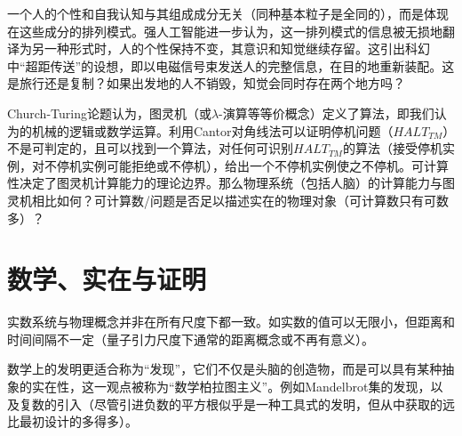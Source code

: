 \par 一个人的个性和自我认知与其组成成分无关（同种基本粒子是全同的），而是体现在这些成分的排列模式。强人工智能进一步认为，这一排列模式的信息被无损地翻译为另一种形式时，人的个性保持不变，其意识和知觉继续存留。这引出科幻中“超距传送”的设想，即以电磁信号束发送人的完整信息，在目的地重新装配。这是旅行还是复制？如果出发地的人不销毁，知觉会同时存在两个地方吗？

\par Church-Turing论题认为，图灵机（或$\lambda$-演算等等价概念）定义了算法，即我们认为的机械的逻辑或数学运算。利用Cantor对角线法可以证明停机问题（$HALT_{TM}$）不是可判定的，且可以找到一个算法，对任何可识别$HALT_{TM}$的算法（接受停机实例，对不停机实例可能拒绝或不停机），给出一个不停机实例使之不停机。可计算性决定了图灵机计算能力的理论边界。那么物理系统（包括人脑）的计算能力与图灵机相比如何？可计算数/问题是否足以描述实在的物理对象（可计算数只有可数多）？

\section{数学、实在与证明}
\par 实数系统与物理概念并非在所有尺度下都一致。如实数的值可以无限小，但距离和时间间隔不一定（量子引力尺度下通常的距离概念或不再有意义）。

\par 数学上的发明更适合称为``发现''，它们不仅是头脑的创造物，而是可以具有某种抽象的实在性，这一观点被称为``数学柏拉图主义''。例如Mandelbrot集的发现，以及复数的引入（尽管引进负数的平方根似乎是一种工具式的发明，但从中获取的远比最初设计的多得多）。
